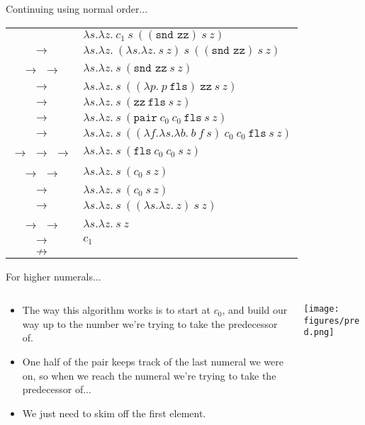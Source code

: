 \documentclass[11pt]{beamer}
\begin{document}
\begin{frame}[fragile=singleslide]{Continuing using normal order...}
\begin{center}
\begin{tabular}{c l}
 & $\lambda s. \lambda z.\:c_1\:s\:((\texttt{snd zz})\:s\:z)$ \\
$\rightarrow$ & $\lambda s. \lambda z.\:(\lambda s. \lambda z.\:s\:z)\:s\:((\texttt{snd zz})\:s\:z)$ \\
$\rightarrow$ $\rightarrow$ & $\lambda s. \lambda z.\:s\:(\texttt{snd zz}\:s\:z)$ \\
$\rightarrow$ & $\lambda s. \lambda z.\:s\:((\lambda p.\:p\:\texttt{fls})\:\texttt{zz}\:s\:z)$ \\
$\rightarrow$ & $\lambda s. \lambda z.\:s\:(\texttt{zz}\:\texttt{fls}\:s\:z)$ \\
$\rightarrow$ & $\lambda s. \lambda z.\:s\:(\texttt{pair}\:c_0\:c_0\:\texttt{fls}\:s\:z)$ \\
$\rightarrow$ & $\lambda s. \lambda z.\:s\:((\lambda f. \lambda s. \lambda b.\:b\:f\:s)\:c_0\:c_0\:\texttt{fls}\:s\:z)$ \\
$\rightarrow$ $\rightarrow$ $\rightarrow$ & $\lambda s. \lambda z.\:s\:(\texttt{fls}\:c_0\:c_0\:s\:z)$ \\
$\rightarrow$ $\rightarrow$ & $\lambda s. \lambda z.\:s\:(c_0\:s\:z)$ \\
$\rightarrow$ & $\lambda s. \lambda z.\:s\:(c_0\:s\:z)$ \\
$\rightarrow$ & $\lambda s. \lambda z.\:s\:((\lambda s. \lambda z.\:z)\:s\:z)$ \\
$\rightarrow$ $\rightarrow$ & $\lambda s. \lambda z.\:s\:z$ \\
$\rightarrow$ & $c_1$ \\
$\nrightarrow$ &  \\
\end{tabular}
\end{center}
\end{frame}


\begin{frame}[fragile=singleslide]{For higher numerals...}

\begin{columns}
\begin{column}{0.5\textwidth}
\begin{itemize}
\item The way this algorithm works is to start at $c_0$, and build our way up to the number we're trying to take the predecessor of.  
\item One half of the pair keeps track of the last numeral we were on, so when we reach the numeral we're trying to take the predecessor of...
\item We just need to skim off the first element.
\end{itemize}
\end{column}
\begin{column}{0.5\textwidth}
\texttt{[image: figures/pred.png]}
\end{column}
\end{columns}
\end{frame}
\end{document}
